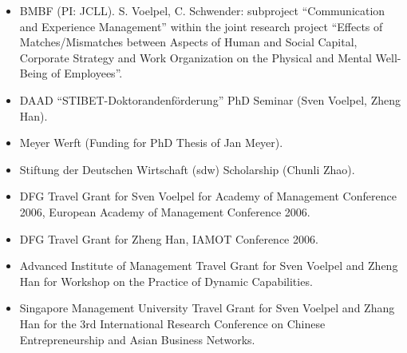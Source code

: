 \begin{itemize}
\item BMBF (PI: JCLL). S. Voelpel, C. Schwender: subproject ``Communication and Experience Management'' within the joint research project ``Effects of Matches/Mismatches between Aspects of Human and Social Capital, Corporate Strategy and Work Organization on the Physical and Mental Well-Being of Employees''. 
\item DAAD ``STIBET-Doktorandenf\"orderung'' PhD Seminar (Sven Voelpel, Zheng Han). 
\item Meyer Werft (Funding for PhD Thesis of Jan Meyer).
\item Stiftung der Deutschen Wirtschaft (sdw) Scholarship (Chunli Zhao). 
\item DFG Travel Grant for Sven Voelpel for Academy of Management Conference 2006, European Academy of Management Conference 2006.
\item DFG Travel Grant for Zheng Han, IAMOT Conference 2006.
\item Advanced Institute of Management Travel Grant for Sven Voelpel and Zheng Han for Workshop on the Practice of Dynamic Capabilities.
\item Singapore Management University Travel Grant for Sven Voelpel and Zhang Han for the 3rd International Research Conference on Chinese Entrepreneurship and Asian Business Networks.
\end{itemize}



